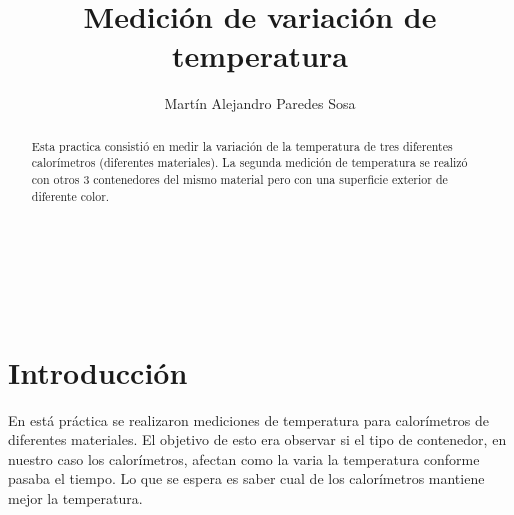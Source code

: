 \documentclass[12pt]{article}
\title{ Medición de variación de temperatura}
\author{Martín Alejandro Paredes Sosa}
\makeatletter
\let\thetitle\@title
\let\theauthor\@author
\makeatother
\begin{document}
\begin{center}
{ \large \bfseries \thetitle}\\
\end{center}
	\begin{minipage}{\textwidth}
		\begin{center} 
			\theauthor 
			\end{center}
	\end{minipage}\\[0.2 cm]
	
\begin{abstract}
	Esta practica consistió en medir la variación de la temperatura de tres diferentes calorímetros (diferentes materiales). La segunda medición de temperatura se realizó con otros 3 contenedores del mismo material pero con una superficie exterior de diferente color.
\end{abstract}
\vspace{-1cm}
\section{Introducción}
\vspace{-.5cm}
En está práctica se realizaron mediciones de temperatura para calorímetros de diferentes materiales. El objetivo de esto era observar si el tipo de contenedor, en nuestro caso los calorímetros, afectan como la varia la temperatura conforme pasaba el tiempo. Lo que se espera es saber cual de los calorímetros mantiene mejor la temperatura.
\end{document}
